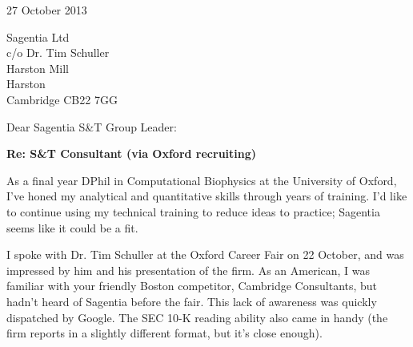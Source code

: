 \documentclass{../res}
\begin{document}
 
\begin{sloppypar}
 
%


\begin{resume} 
 
\vspace{1\baselineskip}

27 October 2013
\vspace{1\baselineskip}

Sagentia Ltd \\
c/o Dr. Tim Schuller \\
Harston Mill \\
Harston \\
Cambridge CB22 7GG
\vspace{1\baselineskip}

Dear Sagentia S\&T Group Leader:

\textbf{Re: S\&T Consultant (via Oxford recruiting)}

As a final year DPhil in Computational Biophysics at the University of Oxford, I've honed my analytical and quantitative skills through years of training. I'd like to continue using my technical training to reduce ideas to practice; Sagentia seems like it could be a fit.

I spoke with Dr. Tim Schuller at the Oxford Career Fair on 22 October, and was impressed by him and his presentation of the firm. As an American, I was familiar with your friendly Boston competitor, Cambridge Consultants, but hadn't heard of Sagentia before the fair. This lack of awareness was quickly dispatched by Google. The SEC 10-K reading ability also came in handy (the firm reports in a slightly different format, but it's close enough).


\end{resume}
\end{sloppypar}
\end{document}
